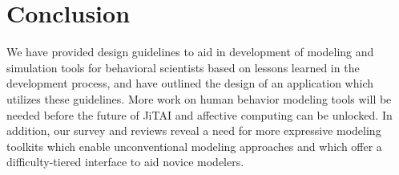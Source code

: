 \documentclass[conference]{IEEEtran}
\begin{document}
% 
% 

\section{Conclusion}
We have provided design guidelines to aid in development of modeling and simulation tools for behavioral scientists based on lessons learned in the development process, and have outlined the design of an application which utilizes these guidelines.
More work on human behavior modeling tools will be needed before the future of JiTAI and affective computing can be unlocked.
In addition, our survey and reviews reveal a need for more expressive modeling toolkits which enable unconventional modeling approaches and which offer a difficulty-tiered interface to aid novice modelers.

%
%
\end{document}
